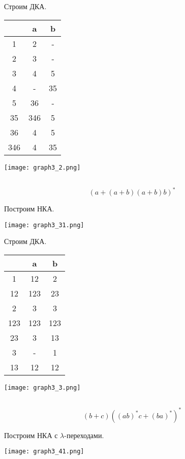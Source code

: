 \documentclass[a4paper, 12pt]{article}
\begin{document}
Строим ДКА.
\begin{center}
\begin{tabular}{|c|c|c|}
\hline
    & a   & b  \\ \hline
1   & 2   & -  \\ \hline
2   & 3   & -  \\ \hline
3   & 4   & 5  \\ \hline
4   & -   & 35 \\ \hline
5   & 36  & -  \\ \hline
35  & 346 & 5  \\ \hline
36  & 4   & 5  \\ \hline
346 & 4   & 35 \\ \hline
\end{tabular}
\texttt{[image: graph3\_2.png]}
\end{center}

\subsection{}
$$(a + (a + b)(a + b)b)^*$$

Построим НКА.
\begin{center}
    \texttt{[image: graph3\_31.png]}
\end{center}

Строим ДКА.
\begin{center}
\begin{tabular}{|c|c|c|}
\hline
    & a   & b   \\ \hline
1   & 12  & 2   \\ \hline
12  & 123 & 23  \\ \hline
2   & 3   & 3   \\ \hline
123 & 123 & 123 \\ \hline
23  & 3   & 13  \\ \hline
3   & -   & 1   \\ \hline
13  & 12  & 12  \\ \hline
\end{tabular}
\texttt{[image: graph3\_3.png]}
\end{center}

\subsection{}
$$(b + c)((ab)^*c + (ba)^*)^*$$


Построим НКА с $\lambda$-переходами.
\begin{center}
    \texttt{[image: graph3\_41.png]}
\end{center}
\end{document}
